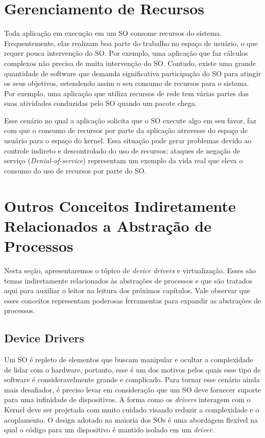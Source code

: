 \section{Gerenciamento de Recursos}

Toda aplicação em execução em um SO consome recursos do sistema.
Frequentemente, elas realizam boa parte do trabalho no espaço de usuário, o que
requer pouca intervenção do SO. Por exemplo, uma aplicação que faz cálculos
complexos não precisa de muita intervenção do SO. Contudo, existe uma grande
quantidade de software que demanda significativa participação do SO para
atingir os seus objetivos, estendendo assim o seu consumo de recursos para o
sistema. Por exemplo, uma aplicação que utiliza recursos de rede tem várias
partes das suas atividades conduzidas pelo SO quando um pacote chega.

Esse cenário no qual a aplicação solicita que o SO execute algo em seu favor,
faz com que o consumo de recursos por parte da aplicação atravesse do espaço de
usuário para o espaço do kernel. Essa situação pode gerar problemas devido ao
controle indireto e descontrolado do uso de recursos; ataques de negação de serviço
(\emph{Denial-of-service}) representam um exemplo da vida real que eleva o
consumo do uso de recursos por parte do SO.

\section{Outros Conceitos Indiretamente Relacionados a Abstração de Processos}

Nesta seção, apresentaremos o tópico de \emph{device drivers} e virtualização.
Esses são temas indiretamente relacionados às abstrações de processos e que são
tratados aqui para auxiliar o leitor na leitura dos próximos capítulos. Vale
observar que esses conceitos representam poderosas ferramentas para expandir as
abstrações de processos.

\subsection{Device Drivers}
\label{sec:dd}

Um SO é repleto de elementos que buscam manipular e ocultar a complexidade de
lidar com o hardware, portanto, esse é um dos motivos pelos quais esse tipo de
software é consideravelmente grande e complicado. Para tornar esse cenário
ainda mais desafiador, é preciso levar em consideração que um SO deve fornecer
suporte para uma infinidade de dispositivos. A forma como os \emph{drivers}
interagem com o Kernel deve ser projetada com muito cuidado visando reduzir a
complexidade e o acoplamento. O design adotado na maioria dos SOs é uma
abordagem flexível na qual o código para um dispositivo é mantido isolado em um
\emph{driver}.

